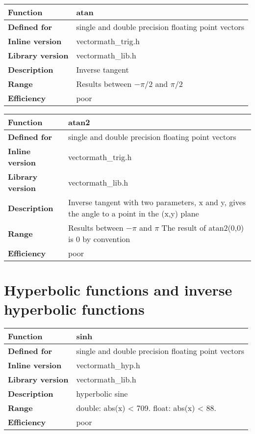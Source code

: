 \documentclass[vcl_manual.tex]{subfiles}
\begin{document}
\begin{tabular}{|p{30mm}|p{120mm}|}
\hline
\bfseries Function & atan \\ \hline
\bfseries Defined for & single and double precision floating point vectors \\ \hline
\bfseries Inline version & vectormath\_trig.h \\ \hline
\bfseries Library version & vectormath\_lib.h \\ \hline
\bfseries Description & Inverse tangent \\ \hline
\bfseries Range & Results between $-\pi/2$ and $\pi/2$ \\ \hline
\bfseries Efficiency & poor \\ \hline
\end{tabular}


\begin{tabular}{|p{30mm}|p{120mm}|}
\hline
\bfseries Function & atan2 \\ \hline
\bfseries Defined for & single and double precision floating point vectors \\ \hline
\bfseries Inline version & vectormath\_trig.h \\ \hline
\bfseries Library version & vectormath\_lib.h \\ \hline
\bfseries Description & Inverse tangent with two parameters, x and y, gives the angle to a point in the (x,y) plane \\ \hline
\bfseries Range & Results between $-\pi$ and $\pi$ \newline
The result of atan2(0,0) is 0 by convention\\ \hline
\bfseries Efficiency & poor \\ \hline
\end{tabular}


\section{Hyperbolic functions and inverse hyperbolic functions}\label{HyperbolicFunctions}

\begin{tabular}{|p{30mm}|p{120mm}|}
\hline
\bfseries Function & sinh \\ \hline
\bfseries Defined for & single and double precision floating point vectors \\ \hline
\bfseries Inline version & vectormath\_hyp.h \\ \hline
\bfseries Library version & vectormath\_lib.h \\ \hline
\bfseries Description & hyperbolic sine \\ \hline
\bfseries Range & double: abs(x) \textless{} 709. float: abs(x) \textless{} 88. \\ \hline
\bfseries Efficiency & poor \\ \hline
\end{tabular}
\end{document}
